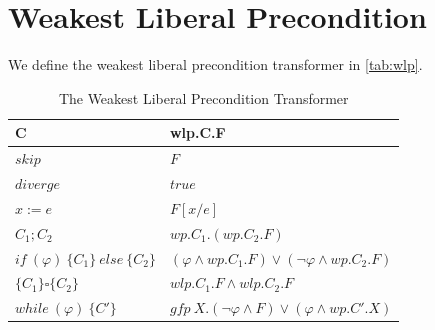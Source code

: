\section{Weakest Liberal Precondition}
We define the weakest liberal precondition transformer in \autoref{tab:wlp}. 
\begin{table}[h!]\centering
    \begin{tabular}{ll}
      \textbf{C}&\textbf{wlp.C.F}    \\ \hline
      $skip$&   $F$   \\
      $diverge$&  $true$\\
      $x:= e $&  $F[x/e]$\\
      $C_1;C_2$&  $wp.C_1.(wp.C_2.F)$\\
      $if\ (\varphi)\ \{C_1\}\ else\ \{C_2\} $&  $(\varphi\wedge wp.C_1.F)\vee(\neg\varphi\wedge wp.C_2.F)$\\
      $\{C_1\}\square \{C_2\}$ & $wlp.C_1.F\wedge wlp.C_2.F$\\
      $while\ (\varphi)\ \{C'\}$&  $gfp\ X.(\neg\varphi\wedge F)\vee(\varphi\wedge wp.C'.X)$\\
    \end{tabular}
    \caption{The Weakest Liberal Precondition Transformer}
    \label{tab:wlp}
\end{table}

